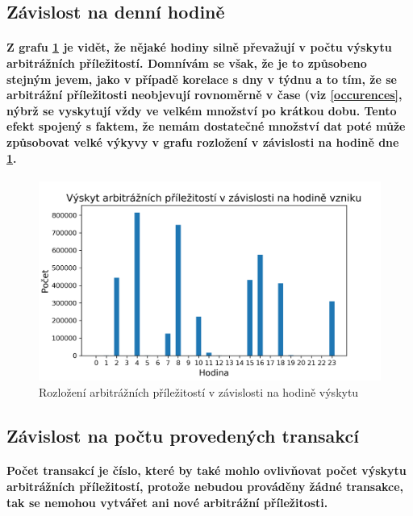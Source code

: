 \documentclass[thesis=B,czech]{FITthesis}[2019/03/21]
\begin{document}
\subsection{Závislost na denní hodině}
\paragraph{
Z grafu \ref{hours_distribution} je vidět, že nějaké hodiny silně převažují v počtu výskytu arbitrážních příležitostí. Domnívám se však, že je to způsobeno stejným jevem, jako v případě korelace s dny v týdnu a to tím, že se arbitrážní příležitosti neobjevují rovnoměrně v čase (viz \ref{occurences}, nýbrž se vyskytují vždy ve velkém množství po krátkou dobu. Tento efekt spojený s faktem, že nemám dostatečné množství dat poté může způsobovat velké výkyvy v grafu rozložení v závislosti na hodině dne \ref{hours_distribution}.
}
\begin{figure}\centering
	\includegraphics[width=1\textwidth]{images/hours_distribution.png}
	\caption{Rozložení arbitrážních příležitostí v závislosti na hodině výskytu }\label{hours_distribution}
\end{figure}
\subsection{Závislost na počtu provedených transakcí}
\paragraph{
Počet transakcí je číslo, které by také mohlo ovlivňovat počet výskytu arbitrážních příležitostí, protože nebudou prováděny žádné transakce, tak se nemohou vytvářet ani nové arbitrážní příležitosti.
}
\end{document}
